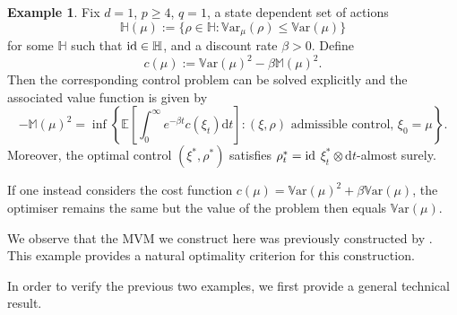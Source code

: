 \documentclass{article}
\newtheorem{theorem}{Theorem}[section]
\theoremstyle{definition}
\newtheorem{example}[theorem]{\textbf{Example}}
\numberwithin{equation}{section}
\numberwithin{theorem}{section}
\newcommand{\E}{\mathbb{E}}
\newcommand{\R}{\mathbb{R}}
\newcommand{\dt}{\mathrm{d}t}
\newcommand{\Hb}{\mathbb{H}}
\newcommand{\Mb}{\mathbb{M}}
\newcommand{\Var}{\mathbb{V}\mathrm{ar}}
\newcommand{\Acal}{{\mathcal A}}
\newcommand{\Pcal}{{\mathcal P}}
\newcommand{\id}{{\rm id}}
\begin{document}
\begin{example}\label{ex92}
Fix $d=1$, $p\geq 4$, $q=1$, a state dependent set of actions
$$\Hb(\mu):=\{\rho\in \Hb\colon \Var_\mu(\rho)\leq\Var(\mu)\}$$
for some $\Hb$ such that $\id\in \Hb$, and
a discount rate $\beta>0$.
Define 
$$
c(\mu):= \Var(\mu)^2 - \beta\Mb(\mu)^2.
$$
Then the corresponding control problem can be solved explicitly and the associated value function is  given by
$$
 -\Mb(\mu)^2
=\inf\left\{  \E\left[ \int_0^\infty e^{-\beta t} c(\xi_t) \dt \right] \colon \text{$(\xi,\rho)$ admissible control, $\xi_0=\mu$}\right\}.
$$
Moreover, the optimal control $(\xi^*,\rho^*)$ satisfies $\rho_t^* =
\id$ $\xi_t^* \otimes \dt$-almost surely. %

If one instead considers the cost function $c(\mu)= \Var(\mu)^2 + \beta\Var(\mu)$, the optimiser remains the same but the value of the problem then equals $\Var(\mu)$.

We observe that the MVM we construct here was previously constructed by \cite[Lemma~2.2]{eldan2016}. This example provides a natural optimality criterion for this construction.
\end{example}




In order to verify the previous two examples, we first provide a general technical result.
\end{document}
